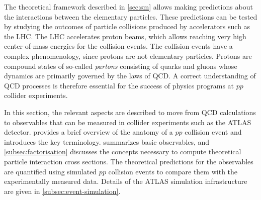 The theoretical framework described in \cref{sec:sm} allows making predictions about the interactions between the elementary particles. 
These predictions can be tested by studying the outcomes of particle collisions produced by accelerators such as the LHC. 
The LHC accelerates proton beams, which allows reaching very high center-of-mass energies for the collision events. 
The collision events have a complex phenomenology, since protons are not elementary particles.
Protons are compound states of so-called \emph{partons} consisting of quarks and gluons whose dynamics are primarily governed by the laws of QCD.
A correct understanding of QCD processes is therefore essential for the success of physics programs at $pp$ collider experiments.

In this section, the relevant aspects are described to move from QCD calculations to observables that can be measured in collider experiments such as the ATLAS detector.
 provides a brief overview of the anatomy of a $pp$ collision event and introduces the key terminology.  summarizes basic observables, and \cref{subsec:factorisation} discusses the concepts necessary to compute theoretical particle interaction cross sections.
The theoretical predictions for the observables are quantified using simulated $pp$ collision events to compare them with the experimentally measured data. Details of the ATLAS simulation infrastructure are given in \cref{subsec:event-simulation}. 




